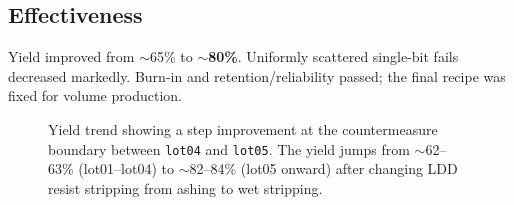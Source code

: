 \subsection{Effectiveness}
Yield improved from $\sim$65\% to \textbf{$\sim$80\%}. Uniformly scattered single-bit fails decreased markedly. Burn-in and retention/reliability passed; the final recipe was fixed for volume production.

\begin{figure}[t]
\centering
{}\yieldtbl
{}
\caption{Yield trend showing a step improvement at the countermeasure boundary
between \texttt{lot04} and \texttt{lot05}. The yield jumps from $\sim$62--63\% (lot01--lot04)
to $\sim$82--84\% (lot05 onward) after changing LDD resist stripping from ashing to wet stripping.}
\label{fig:yield}
\end{figure}

